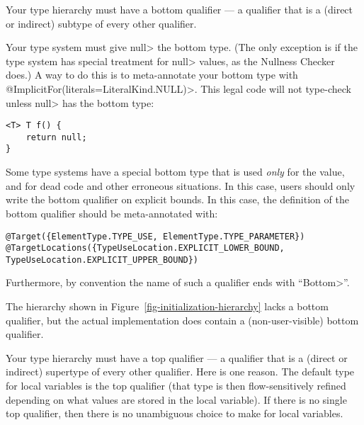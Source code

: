 Your type hierarchy must have a bottom qualifier
--- a qualifier that is a (direct or indirect) subtype of every other
qualifier.

Your type system must give \<null> the bottom type.
(The only exception
is if the type system has special treatment for \<null> values, as the
Nullness Checker does.)
A way to do this is to meta-annotate your bottom type with
\<@ImplicitFor(literals=LiteralKind.NULL)>.
This legal code
will not type-check unless \<null> has the bottom type:
\begin{Verbatim}
<T> T f() {
    return null;
}
\end{Verbatim}


Some type systems have a special bottom type that is used \emph{only} for
the  value, and for dead code and other erroneous situations.
In this case, users should only write the bottom qualifier on explicit
bounds.  In this case, the definition of the bottom qualifier should be
meta-annotated with:

%
\begin{Verbatim}
@Target({ElementType.TYPE_USE, ElementType.TYPE_PARAMETER})
@TargetLocations({TypeUseLocation.EXPLICIT_LOWER_BOUND, TypeUseLocation.EXPLICIT_UPPER_BOUND})
\end{Verbatim}

Furthermore, by convention the name of such a qualifier ends with ``\<Bottom>''.

The hierarchy shown in Figure~\ref{fig-initialization-hierarchy} lacks
a bottom qualifier, but the actual implementation does contain a (non-user-visible) bottom qualifier.


Your type hierarchy must have a top qualifier
--- a qualifier that is a (direct or indirect) supertype of every other
qualifier.
Here is one reason.
The default type for local variables is the top
qualifier (that type is then flow-sensitively
refined depending on what values are stored in the local variable).
If there is no single top qualifier, then there is no
unambiguous choice to make for local variables.


